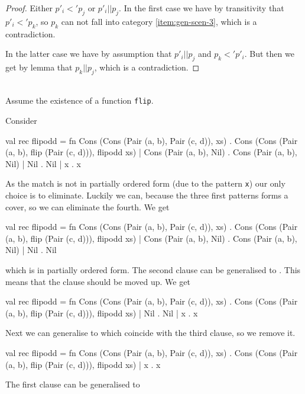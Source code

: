 \begin{definition}[Generalisation, $->g$]
\begin{proof}
    Either $p'_i <' p_j$ or $p'_i || p_j$. In the first case we have by
    transitivity that $p'_i <' p_k$, so $p_k$ can not fall into category
    \ref{item:gen-scen-3}, which is a contradiction.

    In the latter case we have by assumption that $p'_i || p_j$ and $p_k <'
    p'_i$. But then we get by lemma  that $p_k
    || p_j$, which is a contradiction.
  \end{proof}

\end{definition}

\begin{example}[Generalisation, $->g$]\ \\
Assume the existence of a function \texttt{flip}.

Consider

\begin{sml}
val rec flipodd =
fn Cons (Cons (Pair (a, b), Pair (c, d)), xs) .
     Cons (Cons (Pair (a, b), flip (Pair (c, d))), flipodd xs)
 | Cons (Pair (a, b), Nil) . Cons (Pair (a, b), Nil)
 | Nil . Nil
 | x . x
\end{sml}

As the match is not in partially ordered form (due to the pattern \texttt{x})
our only choice is to eliminate. Luckily we can, because the three first
patterns forms a cover, so we can eliminate the fourth. We get
\begin{sml}
val rec flipodd =
fn Cons (Cons (Pair (a, b), Pair (c, d)), xs) .
     Cons (Cons (Pair (a, b), flip (Pair (c, d))), flipodd xs)
 | Cons (Pair (a, b), Nil) . Cons (Pair (a, b), Nil)
 | Nil . Nil
\end{sml}
which is in partially ordered form. The second clause can be generalised to
. This means that the clause  should be moved
up. We get
\begin{sml}
val rec flipodd =
fn Cons (Cons (Pair (a, b), Pair (c, d)), xs) .
     Cons (Cons (Pair (a, b), flip (Pair (c, d))), flipodd xs)
 | Nil . Nil
 | x . x
\end{sml}
Next we can generalise  to  which coincide with
the third clause, so we remove it.
\begin{sml}
val rec flipodd =
fn Cons (Cons (Pair (a, b), Pair (c, d)), xs) .
     Cons (Cons (Pair (a, b), flip (Pair (c, d))), flipodd xs)
 | x . x
\end{sml}
The first clause can be generalised to


\end{example}
